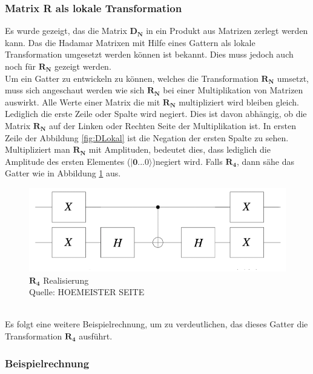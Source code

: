 \subsubsection{Matrix R als lokale Transformation}
Es wurde gezeigt, das die Matrix $\mathbf{D_N}$ in ein Produkt aus Matrizen zerlegt werden kann. Das die Hadamar Matrixen mit Hilfe eines Gattern als lokale Transformation umgesetzt werden können ist bekannt. Dies muss jedoch auch noch für $\mathbf{R_N}$ gezeigt werden. 
\\
Um ein Gatter zu entwickeln zu können, welches die Transformation $\mathbf{R_N}$ umsetzt, muss sich angeschaut werden wie sich $\mathbf{R_N}$ bei einer Multiplikation von Matrizen auswirkt. Alle Werte einer Matrix die mit $\mathbf{R_N}$ multipliziert wird bleiben gleich. Lediglich die erste Zeile oder Spalte wird negiert. Dies ist davon abhängig, ob die Matrix $\mathbf{R_N}$ auf der Linken oder Rechten Seite der Multiplikation ist. In ersten Zeile der Abbildung \ref{fig:DLokal} ist die Negation der ersten Spalte zu sehen.
\\
Multipliziert man $\mathbf{R_N}$ mit Amplituden, bedeutet dies, dass lediglich die Amplitude des ersten Elementes ($\mathbf{|0...0\rangle}$)negiert wird.
Falls $\mathbf{R_4}$, dann sähe das Gatter wie in Abbildung \ref{fig:Rgatter} aus.
 \begin{figure}[hbtp]
 	\centering
 	\includegraphics[width=.8\textwidth]{figures/rgatter.png}
 	\caption{$\mathbf{R_4}$ Realisierung \\ Quelle: HOEMEISTER SEITE}
 	\label{fig:Rgatter}
 \end{figure}
\\
Es folgt eine weitere Beispielrechnung, um zu verdeutlichen, das dieses Gatter die Transformation $\mathbf{R_4}$ ausführt.
\subsubsection{Beispielrechnung}







